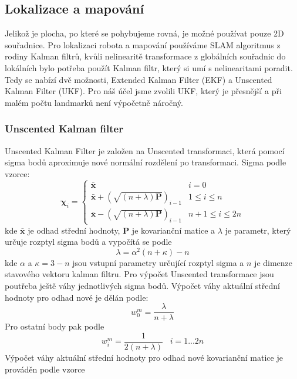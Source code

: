 \documentclass[a4paper,12pt]{article}
\begin{document}
\subsection{Lokalizace a mapování}
Jelikož je plocha, po které se pohybujeme rovná, je možné používat pouze 2D souřadnice. Pro lokalizaci robota a mapování používáme SLAM algoritmus z rodiny 
Kalman filtrů, kvůli nelinearitě transformace z globálních souřadnic do lokálních bylo potřeba použít Kalman filtr, který si umí s nelinearitami poradit. 
Tedy se nabízí dvě možnosti, Extended Kalman Filter (EKF) a Unscented Kalman Filter (UKF). Pro náš účel jsme zvolili UKF, který je přesnější a při malém počtu landmarků není výpočetně náročný.
\subsubsection{Unscented Kalman filter}
\label{sec:ukf}
Unscented Kalman Filter je založen na Unscented transformaci, která pomocí sigma bodů aproximuje nové normální rozdělení po transformaci. 
Sigma podle vzorce:
\begin{equation}
    \boldsymbol{\chi}_{i} = \begin{cases}
        \mathbf{\bar{x}} & i = 0 \\
        \mathbf{\bar{x}} + (\sqrt{(n + \lambda) \mathbf P})_{i-1} & 1 \leq i \leq n \\
        \mathbf{\bar{x}} - (\sqrt{(n + \lambda) \mathbf P})_{i-1} & n + 1 \leq i \leq 2n
    \end{cases}
\end{equation}
kde $\mathbf{\bar{x}}$ je odhad střední hodnoty, $\mathbf P$ je kovarianční matice a $\lambda$ je parametr, který určuje rozptyl sigma bodů a vypočítá se podle
\begin{equation}
    \lambda = \alpha^2(n + \kappa) - n
\end{equation}
kde $\alpha$ a $\kappa = 3 - n$ jsou vstupní parametry určující rozptyl sigma a $n$ je dimenze stavového vektoru kalman filtru. 
Pro výpočet Unscented transformace jsou poutřeba ještě váhy jednotlivých sigma bodů. 
Výpočet váhy aktuální střední hodnoty pro odhad nové je dělán podle: 
\begin{equation}
    w^{m}_0 = \frac{\lambda}{n + \lambda}
\end{equation}
Pro ostatní body pak podle 
\begin{equation}
    w^m_i = \frac{1}{2(n+\lambda)} \;\;\; i = 1...2n
    \label{eq:mean_weights}
\end{equation}
Výpočet váhy aktuální střední hodnoty pro odhad nové kovarianční matice je prováděn podle vzorce
\end{document}
